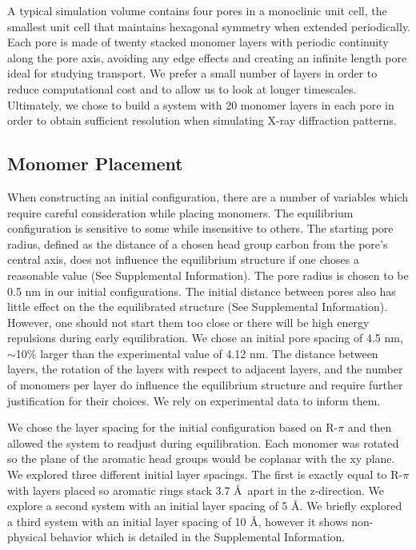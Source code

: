 \documentclass[journal=jpcbfk,manusciprt=article]{achemso}
\begin{document}
  A typical simulation volume contains four pores in a monoclinic unit cell,
  the smallest unit cell that maintains hexagonal symmetry when extended
  periodically. Each pore is made of twenty stacked monomer layers with periodic
  continuity along the pore axis, avoiding any edge effects and creating an
  infinite length pore ideal for studying transport. We prefer a small number of layers
  in order to reduce computational cost and to allow us to look at
  longer timescales. Ultimately, we chose to build a system with 20 monomer
  layers in each pore in order to obtain sufficient resolution when simulating
  X-ray diffraction patterns. %

\subsection{Monomer Placement} 

  When constructing an initial configuration, there are a number of variables
  which require careful consideration while placing monomers. The equilibrium
  configuration is sensitive to some while insensitive to others. The starting
  pore radius, defined as the distance of a chosen head group carbon from the
  pore's central axis, does not influence the equilibrium structure if one choses
  a reasonable value (See Supplemental Information). The pore radius is chosen to
  be 0.5 nm in our initial configurations. The initial distance between pores
  also has little effect on the the equilibrated structure (See Supplemental
  Information). However, one should not start them too close or there will be
  high energy repulsions during early equilibration. We chose an initial pore
  spacing of 4.5 nm, $\sim$10\% larger than the experimental value of 4.12 nm.
  The distance between layers, the rotation of the layers with respect to
  adjacent layers, and the number of monomers per layer do influence the
  equilibrium structure and require further justification for their choices. We
  rely on experimental data to inform them. 

  We chose the layer spacing for the initial configuration based on R-$\pi$ and
  then allowed the system to readjust during equilibration. Each monomer was
  rotated so the plane of the aromatic head groups would be coplanar with the xy
  plane. We explored three different initial layer spacings. The first is exactly
  equal to R-$\pi$ with layers placed so aromatic rings stack 3.7 \AA~apart in
  the z-direction. We explore a second system with an initial layer spacing of 5
  \AA. We briefly explored a third system with an initial layer spacing of 10
  \AA, however it shows non-physical behavior which is detailed in the 
  Supplemental Information. 
\end{document}

